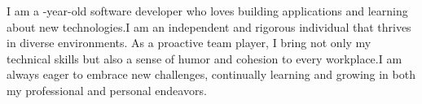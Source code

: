 %
\begin{FlushLeft}%
\myJustification%
I am a \myAgeFloor-year-old software developer who loves building applications and learning about new technologies.I am an independent and rigorous individual that thrives in diverse environments. As a proactive team player, I bring not only my technical skills but also a sense of humor and cohesion to every workplace.I am always eager to embrace new challenges, continually learning and growing in both my professional and personal endeavors.%
\end{FlushLeft}%